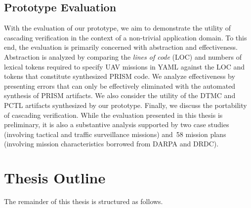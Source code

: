 \subsection{Prototype Evaluation}

With the evaluation of our prototype, we aim to demonstrate the utility of cascading verification in the context of a non-trivial application domain. To this end, the evaluation is primarily concerned with abstraction and effectiveness. Abstraction is analyzed by comparing the \emph{lines of code} (LOC) and numbers of lexical tokens required to specify UAV missions in YAML against the LOC and tokens that constitute synthesized PRISM code. We analyze effectiveness by presenting errors that can only be effectively eliminated with the automated synthesis of PRISM artifacts. We also consider the utility of the DTMC and PCTL artifacts synthesized by our prototype. Finally, we discuss the portability of cascading verification. While the evaluation presented in this thesis is preliminary, it is also a substantive analysis supported by two case studies (involving tactical and traffic surveillance missions) and~58 mission plans (involving mission characteristics borrowed from DARPA and DRDC).

\section{Thesis Outline}

The remainder of this thesis is structured as follows.


